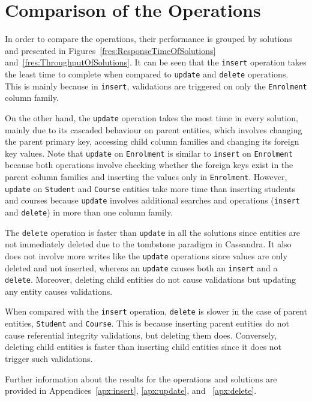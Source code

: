 \section{Comparison of the Operations} \label{s:comparisonOfOperations}

In order to compare the operations, their performance  is grouped by solutions
and presented in Figures~\ref{fres:ResponseTimeOfSolutions}
and~\ref{fres:ThroughputOfSolutions}. It can be seen that the \texttt{insert}
operation takes the least time to complete when compared to \texttt{update} and
\texttt{delete} operations.  This is mainly because in \texttt{insert}, 
validations are triggered on only the \texttt{Enrolment} column family.

On the other hand,  the \texttt{update} operation takes the most time  in every
solution,  mainly due to its cascaded behaviour on parent entities,  which
involves changing the parent primary key,  accessing child column families and
changing its foreign key values.
Note that \texttt{update} on \texttt{Enrolment} is similar to \texttt{insert} on
\texttt{Enrolment} because both operations involve checking whether the foreign
keys exist in the parent column families and inserting the values only in
\texttt{Enrolment}.
However,  \texttt{update} on \texttt{Student} and  \texttt{Course} entities take
more time than inserting students and courses because \texttt{update} involves
additional searches and operations (\texttt{insert} and \texttt{delete})
in more than one column family. 

The \texttt{delete} operation is faster than \texttt{update} in all the
solutions since entities are not immediately deleted due to the tombstone
paradigm in Cassandra.  It also does not involve more writes like the
\texttt{update} operations since values are only deleted and not inserted, 
whereas an \texttt{update} causes both an \texttt{insert} and a \texttt{delete}.
 Moreover, deleting child entities do not cause validations but updating any
entity causes validations.

When compared with the \texttt{insert} operation,  \texttt{delete} is slower in
the case of parent entities,  \texttt{Student} and \texttt{Course}.  This is
because inserting parent entities do not cause referential integrity
validations,  but deleting them does.  Conversely,  deleting child entities is
faster than inserting child entities since it does not trigger such validations.

Further information about the results for the operations and solutions are
provided in Appendices~\ref{apx:insert}, \ref{apx:update}, and
~\ref{apx:delete}.

